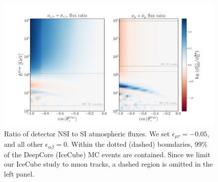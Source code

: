 \documentclass[draft=True]{revtex4-2}
\newcommand{\emt}{\ensuremath{\epsilon_{\mu\tau}}}
\begin{document}
\begin{figure}[!tb]
   \begin{center}
      \includegraphics[width=0.8\linewidth]{figures/flux_ratio.pdf}
   \end{center}
   \caption{Ratio of detector NSI to SI atmospheric fluxes. We set $\emt = -0.05$, and all other $\epsilon_{\alpha\beta}=0$. 
   Within the dotted (dashed) boundaries, 99\% of the  DeepCore (IceCube) MC events are contained. Since we limit our IceCube study to muon tracks,
   a dashed region is omitted in the left panel.}\label{fig:flux_ratio}
\end{figure}%
\end{document}
